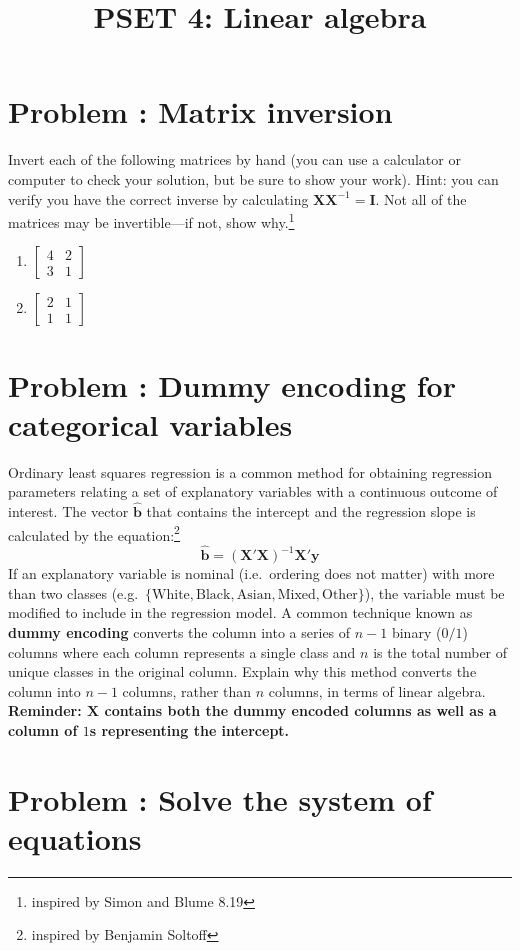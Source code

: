 \documentclass[11pt]{article}
\title{PSET 4: Linear algebra}
\author{}
\date{\vspace{-2.5em}}
\newcounter{problem}
\newcommand{\problem}[1]{\stepcounter{problem}\section*{Problem \theproblem: #1}}
\begin{document}
\maketitle



\problem{Matrix inversion}

Invert each of the following matrices by hand (you can use a calculator
or computer to check your solution, but be sure to show your work).
Hint: you can verify you have the correct inverse by calculating
$\mathbf{XX}^{-1} = \mathbf{I}$. Not all of the matrices may be
invertible---if not, show why.\footnote{inspired by Simon and Blume 8.19}

\begin{enumerate}[label=\alph*.]
\item $\begin{bmatrix} 4 & 2 \\ 3 & 1 \end{bmatrix}$
\item \(\begin{bmatrix} 2 & 1 \\ 1 & 1 \end{bmatrix}\)
\end{enumerate}

\problem{Dummy encoding for categorical variables}

Ordinary least squares regression is a common method for obtaining
regression parameters relating a set of explanatory variables with a
continuous outcome of interest. The vector $\hat{\mathbf{b}}$ that
contains the intercept and the regression slope is calculated by the
equation:\footnote{inspired by Benjamin Soltoff}
\[
\hat{\mathbf{b}} = (\mathbf{X'X})^{-1}\mathbf{X'y}
\]
If an explanatory variable is nominal (i.e.\ ordering does not matter)
with more than two classes
(e.g.\ $\{\text{White}, \text{Black}, \text{Asian}, \text{Mixed}, \text{Other}\}$),
the variable must be modified to include in the regression model. A
common technique known as \textbf{dummy encoding} converts the column
into a series of $n-1$ binary ($0/1$) columns where each column
represents a single class and $n$ is the total number of unique
classes in the original column. Explain why this method converts the
column into $n-1$ columns, rather than $n$ columns, in terms of
linear algebra. \textbf{Reminder: $\mathbf{X}$ contains both the dummy
encoded columns as well as a column of $1$s representing the
intercept.}

\problem{Solve the system of equations}
\end{document}
